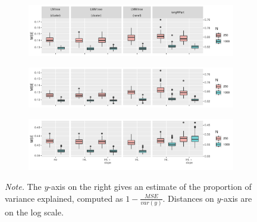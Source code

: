 \documentclass[doc,floatsintext,natbib]{apa7}
\begin{document}
\begin{figure}[!ht]
\caption{Mean squared errors for trees fitted to math (top), reading (middle) and science (bottom) ability trajectories.}
\begin{subfigure}{1.2\textwidth}
\includegraphics{_Partitioning_GCMs_with_GLMM_trees-021}
\end{subfigure}
\begin{subfigure}{1.2\textwidth}
\includegraphics{_Partitioning_GCMs_with_GLMM_trees-022}
\end{subfigure}
\begin{subfigure}{1.2\textwidth}
\includegraphics{_Partitioning_GCMs_with_GLMM_trees-023}
\end{subfigure}
{\footnotesize \textit{Note. }The $y$-axis on the right gives an estimate of the proportion of variance explained, computed as $1 - \frac{MSE}{var(y)}$. Distances on $y$-axis are on the log scale.}
\label{fig:application_MSEs}
\end{figure}
\end{document}
